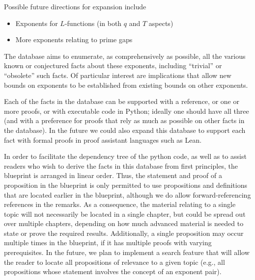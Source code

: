 Possible future directions for expansion include
\begin{itemize}
    \item Exponents for $L$-functions (in both $q$ and $T$ aspects)
    \item More exponents relating to prime gaps
\end{itemize}

The database aims to enumerate, as comprehensively as possible, all the various known or conjectured facts about these exponents, including ``trivial'' or ``obsolete'' such facts.  Of particular interest are implications that allow new bounds on exponents to be established from existing bounds on other exponents.

Each of the facts in the database can be supported with a reference, or one or more proofs, or with executable code in Python; ideally one should have all three (and with a preference for proofs that rely as much as possible on other facts in the database).  In the future we could also expand this database to support each fact with formal proofs in proof assistant languages such as Lean.

In order to facilitate the dependency tree of the python code, as well as to assist readers who wish to derive the facts in this database from first principles, the blueprint is arranged in linear order.  Thus, the statement and proof of a proposition in the blueprint is only permitted to use propositions and definitions that are located earlier in the blueprint, although we do allow forward-referencing references in the remarks.  As a consequence, the material relating to a single topic will not necessarily be located in a single chapter, but could be spread out over multiple chapters, depending on how much advanced material is needed to state or prove the required results.  Additionally, a single proposition may occur multiple times in the blueprint, if it has multiple proofs with varying prerequisites.  In the future, we plan to implement a search feature that will allow the reader to locate all propositions of relevance to a given topic (e.g., all propositions whose statement involves the concept of an exponent pair).
